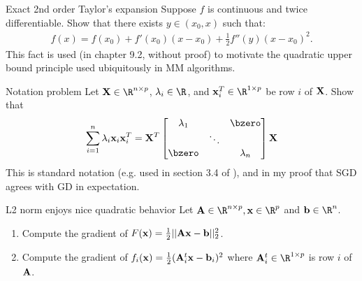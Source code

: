\documentclass[./some_latex_template.tex]{subfiles}
\begin{document}
\begin{problembox}{Exact 2nd order Taylor's expansion}{}
Suppose $f$ is continuous and twice differentiable. Show that there exists $y \in (x_0, x)$ such that:
\begin{align*}
f(x) = f(x_0) + f'(x_0)(x - x_0) + \frac{1}{2} f''(y)(x - x_0)^2.
\end{align*}
This fact is used (in chapter 9.2, without proof) to motivate the quadratic upper bound principle used ubiquitously in MM algorithms. 
\end{problembox}

\begin{problembox}{Notation problem}{}
Let $\bX \in \R^{n \times p}$, $\lambda_i \in \R$, and $\bx_i^T \in \R^{1 \times p}$ be row $i$ of $\mathbf{X}$. Show that
\begin{align*}
	\sum_{i=1}^n \lambda_i \bx_i\bx_i^T = \bX^T
	\begin{bmatrix}
		\lambda_1 & & \bzero \\
		& \ddots & \\
		\bzero & & \lambda_n
	\end{bmatrix} \bX
\end{align*}
This is standard notation (e.g. used in section 3.4 of \cite{dobson2008introduction}), and in my proof that SGD agrees with GD in expectation. 
\end{problembox}

\begin{problembox}{L2 norm enjoys nice quadratic behavior}{}
Let $\bA \in \R^{n \times p}, \bx \in \R^{p}$ and $\bb \in \R^n$.
\begin{enumerate}
	\item Compute the gradient of $F(\mathbf{x}) = \frac{1}{2}||\mathbf{A}\mathbf{x} - \mathbf{b}||^2_2$.
	\item Compute the gradient of $f_i(\mathbf{x}) = \frac{1}{2} (\mathbf{A}_i^t \mathbf{x} - \mathbf{b}_i)^2$ where $\bA_i^t \in \R^{1 \times p}$ is row $i$ of $\mathbf{A}$. 
\end{enumerate}
\end{problembox}



\end{document}
